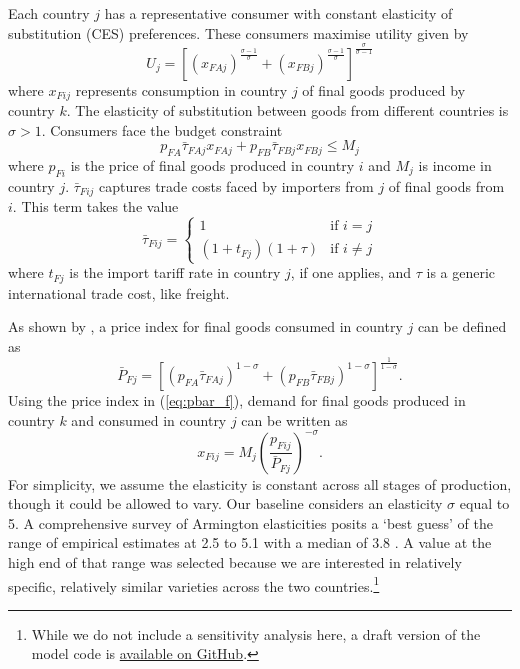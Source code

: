 \documentclass{article}
\begin{document}
Each country $j$ has a representative consumer with constant elasticity of substitution (CES) preferences. These consumers maximise utility given by
\begin{equation}
    U_j = \left[ (x_{FAj})^{\frac{\sigma - 1}{\sigma}} + (x_{FBj})^{\frac{\sigma - 1}{\sigma}} \right]^{\frac{\sigma}{\sigma - 1}}
\end{equation}
where $x_{Fij}$ represents consumption in country $j$ of final goods produced by country $k$. The elasticity of substitution between goods from different countries is $\sigma > 1$. Consumers face the budget constraint 
\begin{equation}
    p_{FA} \bar{\tau}_{FAj} x_{FAj} + p_{FB} \bar{\tau}_{FBj} x_{FBj} \leq M_j
\end{equation}
where $p_{Fi}$ is the price of final goods produced in country $i$ and $M_j$ is income in country $j$. $\bar{\tau}_{Fij}$ captures trade costs faced by importers from $j$ of final goods from $i$. This term takes the value 
\begin{equation} \label{eq:tau}
    \bar{\tau}_{Fij} =
    \begin{cases}
        1 &\text{if } i = j \\
        (1 + t_{Fj})(1 + \tau) &\text{if } i \neq j
    \end{cases}
\end{equation}
where $t_{Fj}$ is the import tariff rate in country $j$, if one applies, and $\tau$ is a generic international trade cost, like freight. 

As shown by \textcite{dixit_monopolistic_1977}, a price index for final goods consumed in country $j$ can be defined as
\begin{equation} \label{eq:pbar_f}
      \bar{P}_{Fj} = \left[ (p_{FA} \bar{\tau}_{FAj} )^{1-\sigma} +  (p_{FB} \bar{\tau}_{FBj})^{1-\sigma} \right]^\frac{1}{1-\sigma} .
\end{equation}
Using the price index in (\ref{eq:pbar_f}), demand for final goods produced in country $k$ and consumed in country $j$ can be written as
\begin{equation}
    x_{Fij} = M_j \left( \frac{p_{Fij}}{\bar{P}_{Fj}} \right)^{-\sigma}  .
\end{equation}
For simplicity, we assume the elasticity is constant across all stages of production, though it could be allowed to vary. Our baseline considers an elasticity $\sigma$ equal to 5. A comprehensive survey of Armington elasticities posits a `best guess' of the range of empirical estimates at 2.5 to 5.1 with a median of 3.8 \parencite{bajzik_estimating_2020}. A value at the high end of that range was selected because we are interested in relatively specific, relatively similar varieties across the two countries.\footnote{While we do not include a sensitivity analysis here, a draft version of the model code is \href{https://github.com/sjhardwick/supply_chains}{available on GitHub}.}
\end{document}
